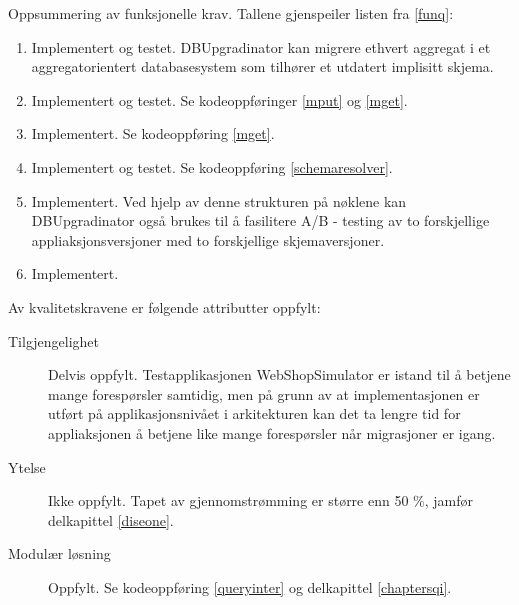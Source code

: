 Oppsummering av funksjonelle krav. Tallene gjenspeiler listen fra \ref{funq}:

\begin{enumerate}
  \item Implementert og testet. DBUpgradinator kan migrere ethvert aggregat i et aggregatorientert databasesystem som tilhører et utdatert implisitt skjema.
  \item Implementert og testet. Se kodeoppføringer \ref{mput} og \ref{mget}.
  \item Implementert. Se kodeoppføring \ref{mget}.
  \item Implementert og testet. Se kodeoppføring \ref{schemaresolver}.
  \item Implementert. Ved hjelp av denne strukturen på nøklene kan DBUpgradinator også brukes til å fasilitere A/B - testing av to forskjellige appliaksjonsversjoner med to forskjellige skjemaversjoner.
  \item Implementert.
\end{enumerate}

Av kvalitetskravene er følgende attributter oppfylt:

\begin{description}
  \item[Tilgjengelighet] Delvis oppfylt. Testapplikasjonen WebShopSimulator er istand til å betjene mange forespørsler samtidig, men på grunn av at implementasjonen er utført på applikasjonsnivået i arkitekturen kan det ta lengre tid for appliaksjonen å betjene like mange forespørsler når migrasjoner er igang.
  \item[Ytelse] Ikke oppfylt. Tapet av gjennomstrømming er større enn 50 \%, jamfør delkapittel \ref{diseone}.
  \item[Modulær løsning] Oppfylt. Se kodeoppføring \ref{queryinter} og delkapittel \ref{chaptersqi}.
\end{description}

